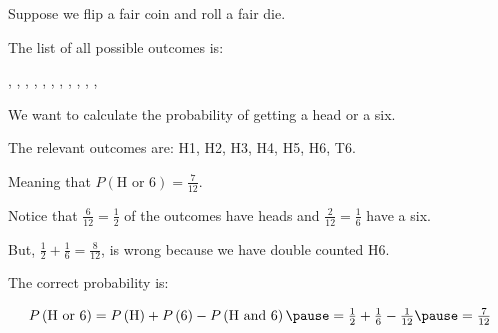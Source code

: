 \documentclass{beamer}
\newcommand{\prob}[1]{P\left(#1\right)}
\begin{document}
\begin{frame}
\begin{example}
Suppose we flip a fair coin and roll a fair die. 

\vspace{2mm}
The list of all possible outcomes is:
\begin{center}
, , , , , , , , , , , 
\end{center}\pause

We want to calculate the probability of getting a head or a six.\pause

\vspace{2mm} 
The relevant outcomes are: H1, H2, H3, H4, H5, H6, T6. 

\vspace{2mm}
Meaning that $\prob{\text{H or 6}} = \tfrac{7}{12}$.\pause

\vspace{2mm}
Notice that $\tfrac{6}{12}=\tfrac{1}{2}$ of the outcomes have heads and $\tfrac{2}{12}=\tfrac{1}{6}$ have a six. \pause

\vspace{2mm}
But, $\tfrac{1}{2}+\tfrac{1}{6}=\frac{8}{12}$, is wrong because we have double counted H6. \pause

\vspace{2mm}
The correct probability is:

\vspace{-3mm}
\begin{equation*}
\prob{\text{H or 6}} = \prob{\text{H}}+\prob{6}-\prob{\text{H and 6}}\pause = \tfrac{1}{2}+\tfrac{1}{6}-\tfrac{1}{12}\pause =\tfrac{7}{12}
\end{equation*}
\vspace{-4mm}
\end{example}
\end{frame}
\end{document}
